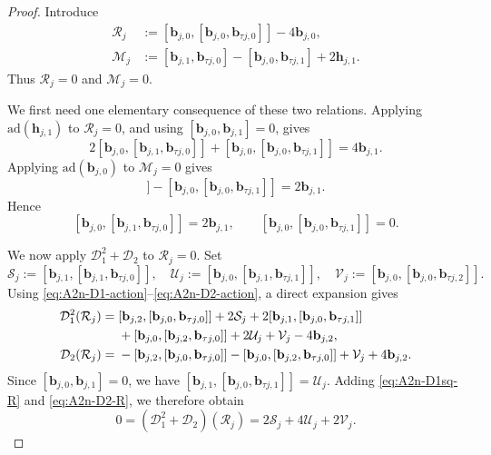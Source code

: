 \documentclass[11pt,reqno]{amsart}
\numberwithin{equation}{section}
\theoremstyle{definition}
\theoremstyle{remark}
\newcommand{\cD}{\mathcal{D}}
\newcommand{\bb}{\mathbf{b}}
\newcommand{\bh}{\mathbf{h}}
\newcommand{\ad}{\mathrm{ad}}
\begin{document}
\begin{proof}
Introduce
\begin{align*}
\mathcal R_j
&:=
[\bb_{j,0},[\bb_{j,0},\bb_{\tau j,0}]]
-4\bb_{j,0},
\\
\mathcal M_j
&:=
[\bb_{j,1},\bb_{\tau j,0}]
-
[\bb_{j,0},\bb_{\tau j,1}]
+
2\bh_{j,1}.
\end{align*}
Thus $\mathcal R_j=0$ and $\mathcal M_j=0$.

We first need one elementary consequence of these two relations. 
Applying $\ad(\bh_{j,1})$ to $\mathcal R_j=0$, and using
$[\bb_{j,0},\bb_{j,1}]=0$, gives
\begin{equation*}
2[\bb_{j,0},[\bb_{j,1},\bb_{\tau j,0}]]+[\bb_{j,0},[\bb_{j,0},\bb_{\tau j,1}]]
=
4\bb_{j,1}.
\end{equation*}
Applying $\ad(\bb_{j,0})$ to $\mathcal M_j=0$ gives
\begin{equation*}
[\bb_{j,0},[\bb_{j,1},\bb_{\tau j,0}]]-[\bb_{j,0},[\bb_{j,0},\bb_{\tau j,1}]]
=
2\bb_{j,1}.
\end{equation*}
Hence
\begin{equation}\label{9999}
[\bb_{j,0},[\bb_{j,1},\bb_{\tau j,0}]]=2\bb_{j,1},
\qquad
[\bb_{j,0},[\bb_{j,0},\bb_{\tau j,1}]]=0.
\end{equation}

We now apply $\cD_1^2+\cD_2$ to $\mathcal R_j=0$.  Set
\begin{equation*}
\mathcal S_j
:=
[\bb_{j,1},[\bb_{j,1},\bb_{\tau j,0}]],\quad 
\mathcal U_j
:=
[\bb_{j,0},[\bb_{j,1},\bb_{\tau j,1}]],
\quad
\mathcal V_j
:=
[\bb_{j,0},[\bb_{j,0},\bb_{\tau j,2}]].
\end{equation*}
Using \eqref{eq:A2n-D1-action}--\eqref{eq:A2n-D2-action}, a direct
expansion gives
\begin{align}
\cD_1^2(\mathcal R_j)
={}&
[\bb_{j,2},[\bb_{j,0},\bb_{\tau j,0}]]
+
2\mathcal S_j
+
2[\bb_{j,1},[\bb_{j,0},\bb_{\tau j,1}]]
\notag\\
&
+
[\bb_{j,0},[\bb_{j,2},\bb_{\tau j,0}]]
+
2\mathcal U_j
+
\mathcal V_j
-
4\bb_{j,2},
\label{eq:A2n-D1sq-R}
\\
\cD_2(\mathcal R_j)
={}&
-[\bb_{j,2},[\bb_{j,0},\bb_{\tau j,0}]]
-
[\bb_{j,0},[\bb_{j,2},\bb_{\tau j,0}]]
+
\mathcal V_j
+
4\bb_{j,2}.
\label{eq:A2n-D2-R}
\end{align}
Since $[\bb_{j,0},\bb_{j,1}]=0$, we have $[\bb_{j,1},[\bb_{j,0},\bb_{\tau j,1}]]
=
\mathcal U_j$. Adding \eqref{eq:A2n-D1sq-R} and
\eqref{eq:A2n-D2-R}, we therefore obtain
\begin{equation}\label{eq:A2n-Dsum-R}
0
=
(\cD_1^2+\cD_2)(\mathcal R_j)
=
2\mathcal S_j+4\mathcal U_j+2\mathcal V_j.
\end{equation}


\end{proof}
\end{document}
